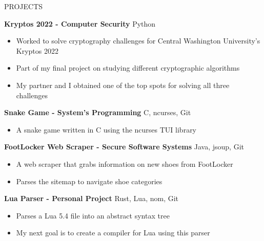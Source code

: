 \documentclass{resume}
\begin{document}
\begin{rSection}{PROJECTS}
	\vspace{-1.25em}

	\item \textbf{Kryptos 2022 - Computer Security} \hfill {Python}\\
	\vspace{-1.25em}
	\begin{itemize}
		\setlength{\itemsep}{-3pt}
		\item Worked to solve cryptography challenges for Central Washington University's Kryptos 2022
		\item Part of my final project on studying different cryptographic algorithms
		\item My partner and I obtained one of the top spots for solving all three challenges
	\end{itemize}

	\item \textbf{Snake Game - System's Programming} \hfill {C, ncurses, Git}\\
	\vspace{-1.25em}
	\begin{itemize}
		\setlength{\itemsep}{-3pt}
		\item A snake game written in C using the ncurses TUI library
	\end{itemize}

\item \textbf{FootLocker Web Scraper - Secure Software Systems} \hfill {Java, jsoup, Git}\\
	\vspace{-1.25em}
	\begin{itemize}
		\setlength{\itemsep}{-3pt}
		\item A web scraper that grabs information on new shoes from FootLocker
		\item Parses the sitemap to navigate shoe categories
	\end{itemize}

	\item \textbf{Lua Parser - Personal Project} \hfill {Rust, Lua, nom, Git}\\
	\vspace{-1.25em}
	\begin{itemize}
		\setlength{\itemsep}{-3pt}
		\item Parses a Lua 5.4 file into an abstract syntax tree
		\item My next goal is to create a compiler for Lua using this parser
	\end{itemize}
\end{rSection}

\end{document}
